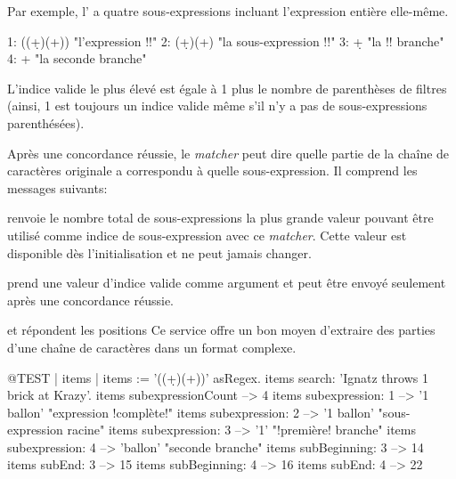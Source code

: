 \documentclass[a4paper,10pt,twoside]{book}
\begin{document}
{
Par exemple, l'\expreg \ct{((\d+)\s*(\w+))} a quatre sous-expressions
incluant l'expression entière elle-même.
\begin{code}{}
1:    ((\d+)\s*(\w+))    "l'expression !!"
2:    (\d+)\s*(\w+)       "la sous-expression !!"
3:    \d+                      "la !! branche"
4:    \w+                     "la seconde branche"
\end{code}

L'indice valide le plus élevé est égale à 1 plus le nombre de
parenthèses de filtres (ainsi, 1 est toujours un indice valide même
s'il n'y a pas de sous-expressions parenthésées).

Après une concordance réussie, le \emph{matcher} peut dire quelle
partie de la chaîne de caractères originale a correspondu à quelle
sous-expression. Il comprend les messages suivants:

 renvoie le nombre total de
sous-expressions \ie la plus grande valeur pouvant être utilisé comme
indice de sous-expression avec ce \emph{matcher}. Cette valeur est
disponible dès l'initialisation et ne peut jamais changer.

 prend une valeur d'indice valide
comme argument et peut être envoyé seulement après une concordance
réussie. 

 et 
répondent les positions 
Ce service offre un bon moyen d'extraire des parties d'une chaîne de
caractères dans un format complexe.

\begin{code}{@TEST | items |}
items := '((\d+)\s*(\w+))' asRegex.
items search: 'Ignatz throws 1 brick at Krazy'.
items subexpressionCount --> 4
items subexpression: 1      --> '1 ballon'    "expression !complète!"
items subexpression: 2      --> '1 ballon'    "sous-expression racine"
items subexpression: 3      --> '1'             "!première! branche"
items subexpression: 4      --> 'ballon'       "seconde branche"
items subBeginning: 3       --> 14
items subEnd: 3                 --> 15
items subBeginning: 4       --> 16
items subEnd: 4                 --> 22
\end{code}

}
\end{document}
